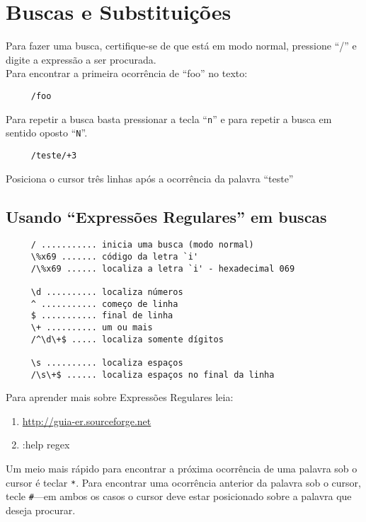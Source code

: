 \chapter{Buscas e Substituições}\label{Buscas e substituições}

Para fazer uma busca, certifique-se de que está em modo normal,
pressione ``/'' e digite a expressão a ser procurada. \\


Para encontrar a primeira ocorrência de ``foo'' no texto:

\begin{verbatim}
     /foo
\end{verbatim}

Para repetir a busca basta pressionar a tecla ``\verb+n+'' e para
repetir a busca em sentido oposto ``\verb+N+''.

\begin{verbatim}
     /teste/+3
\end{verbatim}

Posiciona o cursor três linhas após a ocorrência da palavra ``teste'' \\


\section{Usando ``Expressões Regulares'' em buscas}

\begin{verbatim}
     / ........... inicia uma busca (modo normal)
     \%x69 ....... código da letra `i'
     /\%x69 ...... localiza a letra `i' - hexadecimal 069
     
     \d .......... localiza números
     ^ ........... começo de linha
     $ ........... final de linha
     \+ .......... um ou mais
     /^\d\+$ ..... localiza somente dígitos
     
     \s .......... localiza espaços
     /\s\+$ ...... localiza espaços no final da linha 
\end{verbatim}

Para aprender mais sobre Expressões Regulares leia:

\begin{enumerate}
  \item \url{http://guia-er.sourceforge.net}
  \item :help regex
\end{enumerate}

    Um meio mais rápido para encontrar a próxima ocorrência de uma palavra sob o
cursor é teclar \verb|*|. Para encontrar uma ocorrência anterior da palavra
sob o cursor, tecle \verb|#|---em ambos os casos o cursor deve estar
posicionado sobre a palavra que deseja procurar.

